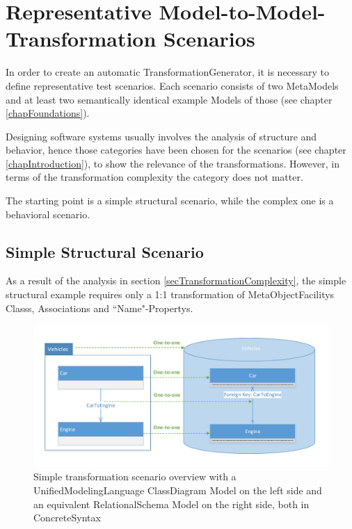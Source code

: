 \chapter{Representative Model-to-Model-Transformation Scenarios}\label{chapM2MScenarios}

In order to create an automatic \gls{TransformationGenerator}, it is necessary to define representative test scenarios. Each scenario consists of two \glspl{MetaModel} and at least two semantically identical example \glspl{Model} of those (see chapter \ref{chapFoundations}). 

Designing software systems usually involves the analysis of structure and behavior, hence those categories have been chosen for the scenarios (see chapter \ref{chapIntroduction}), to show the relevance of the transformations. However, in terms of the transformation complexity the category does not matter.

The starting point is a simple structural scenario, while the complex one is a behavioral scenario.

\section{Simple Structural Scenario}\label{secM2MScenarioStructuralSimple}

As a result of the analysis in section \ref{secTransformationComplexity}, the simple structural example requires only a 1:1 transformation of \glspl{MetaObjectFacility} \glspl{Class}, \glspl{Association} and ``Name"-\glspl{Property}.

\begin{figure}[htb]
	\centering
	\includegraphics[scale=0.6, trim=0cm 1cm 0cm 1cm, clip=true]{Images/ScenarioStructuralSimpleOverview.pdf} 
	\caption{Simple transformation scenario overview with a \Gls{UnifiedModelingLanguage} \gls{ClassDiagram} \gls{Model} on the left side and an equivalent \gls{RelationalSchema} \gls{Model} on the right side, both in \gls{ConcreteSyntax}}
	\label{figScenarioStructuralSimpleOverview}
\end{figure}

